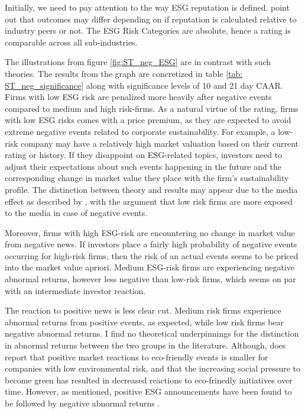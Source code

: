 Initially, we need to pay attention to the way ESG reputation is defined. \cite{rennings2007effect} point out that outcomes may differ depending on if reputation is calculated relative to industry peers or not. The ESG Risk Categories are absolute, hence a rating is comparable across all sub-industries. 

The illustrations from figure \ref{fig:ST_neg_ESG} are in contrast with such theories. The results from the graph are concretized in table \ref{tab: ST_neg_significance} along with significance levels of 10 and 21 day CAAR. Firms with low ESG risk are penalized more heavily after negative events compared to medium and high risk-firms. As a natural virtue of the rating, firms with low ESG risks comes with a price premium, as they are expected to avoid extreme negative events related to corporate sustainability. For example, a low-risk company may have a relatively high market valuation based on their current rating or history. If they disappoint on ESG-related topics, investors need to adjust their expectations about such events happening in the future and the corresponding change in market value they place with the firm's sustainability profile. The distinction between theory and results may appear due to the media effect as described by \cite{noNewsgoodnews}, with the argument that low risk firms are more exposed to the media in case of negative events. 

Moreover, firms with high ESG-risk are encountering no change in market value from negative news. If investors place a fairly high probability of negative events occurring for high-risk firms, then the risk of an actual events seems to be priced into the market value apriori. Medium ESG-risk firms are experiencing negative abnormal returns, however less negative than low-risk firms, which seems on par with an intermediate investor reaction.  

The reaction to positive news is less clear cut. Medium risk firms experience abnormal returns from positive events, as expected, while low risk firms bear negative abnormal returns. I find no theoretical underpinnings for the distinction in abnormal returns between the two groups in the literature. Although, \cite{flammer2013corporate} does report that positive market reactions to eco-friendly events is smaller for companies with low environmental risk, and that the increasing social pressure to become green has resulted in decreased reactions to eco-frinedly initiatives over time. However, as mentioned, positive ESG announcements have been found to be followed by negative abnormal returns \citep{fisher2011voluntary}.  


